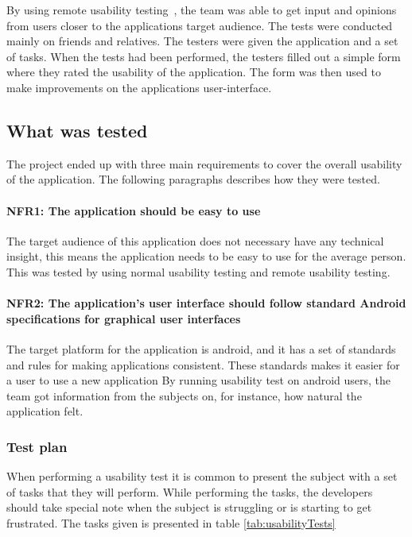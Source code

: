 
By using remote usability testing~\cite{remoteTest}, the team was able to get input and opinions from users closer to the applications target audience.
The tests were conducted mainly on friends and relatives. The testers were given the application and a set of tasks. When the tests had been performed, the testers filled out a simple form where they rated the usability of the application. The form was then used to make improvements on the applications user-interface.

\subsection{What was tested}
The project ended up with three main requirements to cover the overall usability of the application. The following paragraphs describes how they were tested.

\paragraph{NFR1: The application should be easy to use}
The target audience of this application does not necessary have any technical insight, this means the application needs to be easy to use for the average person. This was tested by using normal usability testing and remote usability testing.

\paragraph{NFR2: The application's user interface should follow standard Android specifications for graphical user interfaces}
The target platform for the application is android, and it has a set of standards and rules for making applications consistent. These standards makes it easier for a user to use a new application 
By running usability test on android users, the team got information from the subjects on, for instance, how natural the application felt.

\subsubsection{Test plan}
When performing a usability test it is common to present the subject with a set of tasks that they will perform. While performing the tasks, the developers should take special note when the subject is struggling or is starting to get frustrated. The tasks given is presented in table \ref{tab:usabilityTests}

